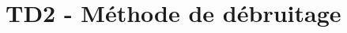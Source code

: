 \documentclass{report}
\begin{document}
\chapter{TD2 - Méthode de débruitage}
%
%
%
%
\end{document}
